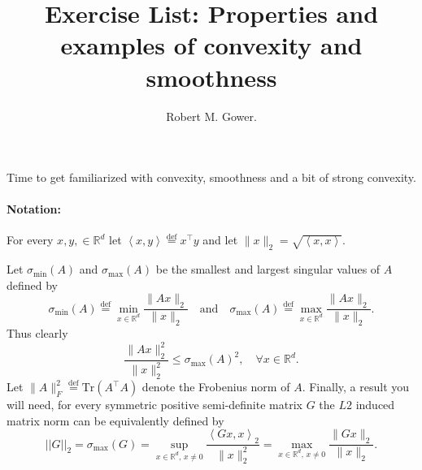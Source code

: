 \documentclass[11pt]{article}
\title{Exercise List: Properties and examples of convexity and smoothness}
\author{Robert M. Gower.}
\newcommand{\R}{\mathbb{R}}
\newcommand{\eqdef}{\overset{\text{def}}{=}}
\newcommand{\norm}[1]{\lVert#1\rVert}
\newcommand{\dotprod}[1]{\left< #1\right>}
\newcommand{\Tr}[1]{\mbox{Tr}\left( #1\right)}
\begin{document}
\maketitle
Time to get familiarized with convexity, smoothness and a bit of strong convexity. 
\paragraph{Notation:} For every $x, y, \in \R^d$ let $\dotprod{x,y} \eqdef x^\top y$ and let $\norm{x}_2 = \sqrt{\dotprod{x,x}}.$ 

Let $\sigma_{\min}(A)$ and $\sigma_{\max}(A)$ be the smallest and largest singular values of $A$ defined by
\begin{equation} \label{eq:sigvals}
\sigma_{\min}(A) \eqdef \min_{x \in \R^d} \frac{\norm{Ax}_2}{\norm{x}_2} \quad \mbox{and} \quad \sigma_{\max}(A) \eqdef \max_{x \in \R^d} \frac{\norm{Ax}_2}{\norm{x}_2} .
\end{equation}
Thus clearly
\begin{equation}\label{eq:induced}
\frac{\norm{Ax}_2^2}{\norm{x}_2^2} \leq \sigma_{\max}(A)^2, \quad \forall x \in \R^d.
\end{equation}
Let $\norm{A}_F^2 \eqdef \Tr{A^\top A}$ denote the Frobenius norm of $A.$ Finally, a result you will need, for every symmetric positive semi-definite matrix $G$ the $L2$ induced matrix norm can be equivalently defined by
\begin{equation} \label{eq:inducedG}
||G||_2 = \sigma_{\max}(G) = \sup_{x \in \R^d,\, x \neq 0} \frac{\dotprod{Gx,x}_2}{\norm{x}_2^2} = \max_{x \in \R^d,\, x \neq 0} \frac{\norm{Gx}_2}{\norm{x}_2}.
\end{equation}
  
\end{document}
